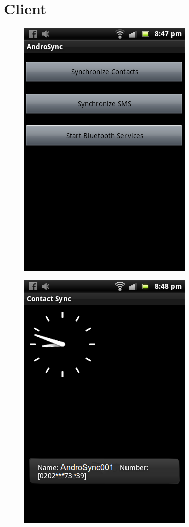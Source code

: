 \section{Client}
\begin{figure}[H]
  \centering
    \includegraphics[scale=0.6]{project/images/AndroSyncClient/andro-client01}
\end{figure}
\vspace{1cm}
\begin{figure}[H]
  \centering
    \includegraphics[scale=0.6]{project/images/AndroSyncClient/andro-client02}
\end{figure}
